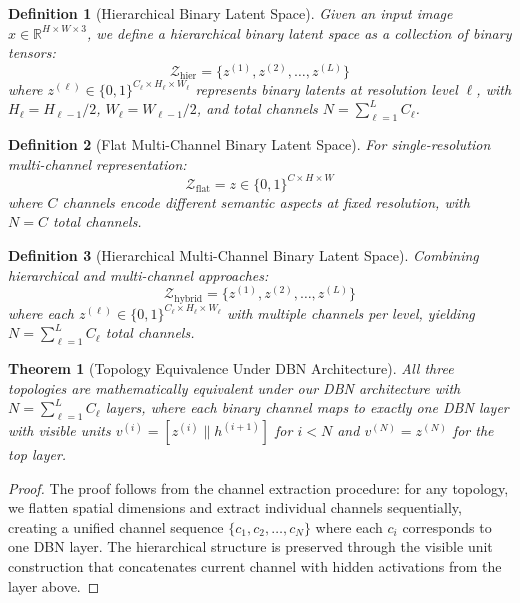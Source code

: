 \documentclass{article}
\newtheorem{theorem}{Theorem}
\newtheorem{definition}{Definition}
\begin{document}
\begin{definition}[Hierarchical Binary Latent Space]
Given an input image $x \in \mathbb{R}^{H \times W \times 3}$, we define a hierarchical binary latent space as a collection of binary tensors:
\begin{equation}
\mathcal{Z}_{\text{hier}} = \{z^{(1)}, z^{(2)}, \ldots, z^{(L)}\}
\end{equation}
where $z^{(\ell)} \in \{0,1\}^{C_\ell \times H_\ell \times W_\ell}$ represents binary latents at resolution level $\ell$, with $H_\ell = H_{\ell-1}/2$, $W_\ell = W_{\ell-1}/2$, and total channels $N = \sum_{\ell=1}^L C_\ell$.
\end{definition}

\begin{definition}[Flat Multi-Channel Binary Latent Space]
For single-resolution multi-channel representation:
\begin{equation}
\mathcal{Z}_{\text{flat}} = z \in \{0,1\}^{C \times H \times W}
\end{equation}
where $C$ channels encode different semantic aspects at fixed resolution, with $N = C$ total channels.
\end{definition}

\begin{definition}[Hierarchical Multi-Channel Binary Latent Space]
Combining hierarchical and multi-channel approaches:
\begin{equation}
\mathcal{Z}_{\text{hybrid}} = \{z^{(1)}, z^{(2)}, \ldots, z^{(L)}\}
\end{equation}
where each $z^{(\ell)} \in \{0,1\}^{C_\ell \times H_\ell \times W_\ell}$ with multiple channels per level, yielding $N = \sum_{\ell=1}^L C_\ell$ total channels.
\end{definition}

\begin{theorem}[Topology Equivalence Under DBN Architecture]
All three topologies are mathematically equivalent under our DBN architecture with $N = \sum_{\ell=1}^L C_\ell$ layers, where each binary channel maps to exactly one DBN layer with visible units $v^{(i)} = [z^{(i)} \| h^{(i+1)}]$ for $i < N$ and $v^{(N)} = z^{(N)}$ for the top layer.
\end{theorem}

\begin{proof}
The proof follows from the channel extraction procedure: for any topology, we flatten spatial dimensions and extract individual channels sequentially, creating a unified channel sequence $\{c_1, c_2, \ldots, c_N\}$ where each $c_i$ corresponds to one DBN layer. The hierarchical structure is preserved through the visible unit construction that concatenates current channel with hidden activations from the layer above.
\end{proof}
\end{document}
